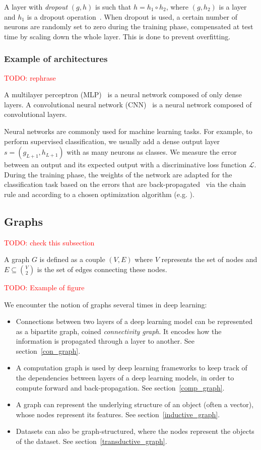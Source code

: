 \documentclass{article}
\theoremstyle{definition}
\theoremstyle{remark}
\theoremstyle{plain}
\newcommand{\todo}[1]{\textcolor{red}{TODO: #1\\}}
\begin{document}
A layer with \textit{dropout} $(g,h)$ is such that $h = h_1 \circ h_2$, where $(g,h_2)$ is a layer and $h_1$ is a dropout operation~\cite{srivastava2014dropout}. When dropout is used, a certain number of neurons are randomly set to zero during the training phase, compensated at test time by scaling down the whole layer. This is done to prevent overfitting.

\subsubsection{Example of architectures}

\todo{rephrase}

A multilayer perceptron (MLP)~\cite{hornik1989multilayer} is a neural network composed of only dense layers.
A convolutional neural network (CNN)~\cite{lecun1998gradient} is a neural network composed of convolutional layers.

Neural networks are commonly used for machine learning tasks. For example, to perform supervised classification, we usually add a dense output layer $s=(g_{L+1},h_{L+1})$ with as many neurons as classes. We measure the error between an output and its expected output with a discriminative loss function $\mathcal{L}$. During the training phase, the weights of the network are adapted for the classification task based on the errors that are back-propagated~\cite{hornik1989multilayer} via the chain rule and according to a chosen optimization algorithm (e.g. \cite{bottou2010large}).

\subsection{Graphs}

\todo{check this subsection}

A graph $G$ is defined as a couple $(V,E)$ where $V$ represents the set of nodes and $E \subseteq\binom{V}{2}$ is the set of edges connecting these nodes.

\todo{Example of figure}

We encounter the notion of graphs several times in deep learning:
\begin{itemize}
\item Connections between two layers of a deep learning model can be represented as a bipartite graph, coined \emph{connectivity graph}. It encodes how the information is propagated through a layer to another. See section~\ref{con_graph}.
\item A computation graph is used by deep learning frameworks to keep track of the dependencies between layers of a deep learning models, in order to compute forward and back-propagation. See section~\ref{comp_graph}.
\item A graph can represent the underlying structure of an object (often a vector), whose nodes represent its features. See section~\ref{inductive_graph}.
\item Datasets can also be graph-structured, where the nodes represent the objects of the dataset. See section~\ref{transductive_graph}.
\end{itemize}
\end{document}
